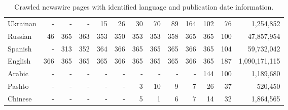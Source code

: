 \documentclass{article}
\begin{document}
\begin{table}[h!]
\begin{center}
\begin{tabular}{lrrrrrrrrrrrr}
Ukrainan	&	-	&	-	&	-	&	15	&	26	&	30	&	70	&	89	&	164	&	102	&	76	&	1,254,852\\
Russian	&	46	&	365	&	363	&	353	&	350	&	353	&	353	&	358	&	365	&	365	&	100	&	47,857,954\\
Spanish	&	-	&	313	&	352	&	364	&	366	&	365	&	365	&	365	&	366	&	365	&	104	&	59,732,042\\
English	&	366	&	365	&	365	&	365	&	366	&	365	&	365	&	365	&	366	&	365	&	187	&	1,090,171,115\\
Arabic	&	-	&	-	&	-	&	-	&	-	&	-	&	-	&	-	&	-	&	144	&	100	&	1,189,680\\
Pashto	&	-	&	-	&	-	&	-	&	-	&	3	&	10	&	9	&	7	&	26	&	37	&	520,450\\
Chinese	&	-	&	-	&	-	&	-	&	-	&	5	&	1	&	6	&	7	&	14	&	32	&	1,864,565\\
\end{tabular}
\end{center}
\normalsize
\caption{Crawled newswire pages with identified language and publication date information.}
\label{fig:newsstats}
\end{table}
\end{document}
